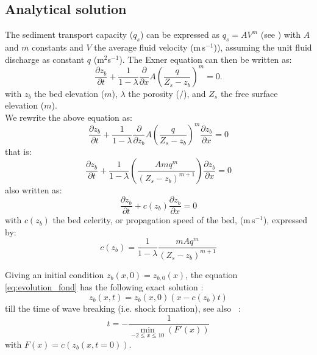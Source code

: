 \subsection{Analytical solution}
%
The sediment transport capacity ($q_s$) can be expressed as $q_s = AV^m$ (see \citet{Kubatko2008}) with $A$ and $m$ constants and $V$ the average fluid velocity (m\,s$^{-1}$)), assuming the unit fluid discharge as constant $q$ (m$^2$s$^{-1}$).
The Exner equation can then be written as:
\begin{equation}
\frac{\partial z_b}{\partial t}+\frac{1}{1-\lambda}\frac{\partial}{\partial x}A \left(\frac{q}{ Z_s-z_b}\right)^m=0.
\end{equation}
with $z_b$ the bed elevation ($m$), $\lambda$ the porosity ($/$), and $Z_s$ the free surface elevation ($m$). \\
We rewrite the above equation as:
\begin{equation*}
\frac{\partial z_b}{\partial t}+\frac{1}{1-\lambda}\frac{\partial }{\partial z_b} A\left(\frac{q}{Z_s-z_b} \right)^m\frac{\partial z_b}{\partial x}=0
\end{equation*}
that is:
\begin{equation*}
\frac{\partial z_b}{\partial t}+\frac{1}{1-\lambda}\left(\frac{Amq^m}{(Z_s-z_b)^{m+1}} \right)\frac{\partial z_b}{\partial x}=0
\end{equation*}
also written as:
\begin{equation}
\frac{\partial z_b}{\partial t}+c(z_b)\frac{\partial z_b}{\partial x}=0
\label{eq:evolution_fond}\end{equation}
with $c(z_b)$ the bed celerity, or propagation speed of the bed, (m\,s$^{-1}$), expressed by:
\begin{equation}
c (z_b)=\frac{1}{1-\lambda}\frac{m A q^{m}}{ (Z_s-z_b)^{m+1}}
\label{eq:cel}
\end{equation}

Giving an initial condition $z_b(x,0)=z_{b,0}(x)$, the equation \eqref{eq:evolution_fond} has the following exact solution :
\begin{equation}
z_b(x,t)=z_b(x,0)(x-c(z_b)t)
\end{equation}
till the time of wave breaking (i.e. shock formation), see also ~\citet{Kubatko2008}:
\begin{equation}
t=-\frac{1}{\min \limits_{-2\leq x \leq 10} (F' (x))}
\end{equation}
with $F(x)=c (z_b (x,t=0))$.

